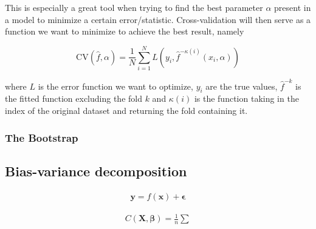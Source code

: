 This is especially a great tool when trying to find the best parameter $\alpha$ present in a model to minimize a certain error/statistic. Cross-validation will then serve as a function we want to minimize to achieve the best result, namely

\begin{equation}
  \text{CV}(\hat f, \alpha) = \frac{1}{N}\sum_{i=1}^N L\left(y_i, \hat f^{-\kappa(i)}(x_i, \alpha)\right)
\end{equation}

where $L$ is the error function we want to optimize, $y_i$ are the true values, $\hat f^{-k}$ is the fitted function excluding the fold $k$ and $\kappa(i)$ is the function taking in the index of the original dataset and returning the fold containing it. 

\subsubsection{The Bootstrap}


\subsection{Bias-variance decomposition}

\begin{align*}
    \textbf{y}=f(\textbf{x})+\boldsymbol{\epsilon}
\end{align*}

\begin{align}
    C(\boldsymbol{X}, \boldsymbol{\beta}) = \frac{1}{n}\sum_{}^{}
\end{align}


